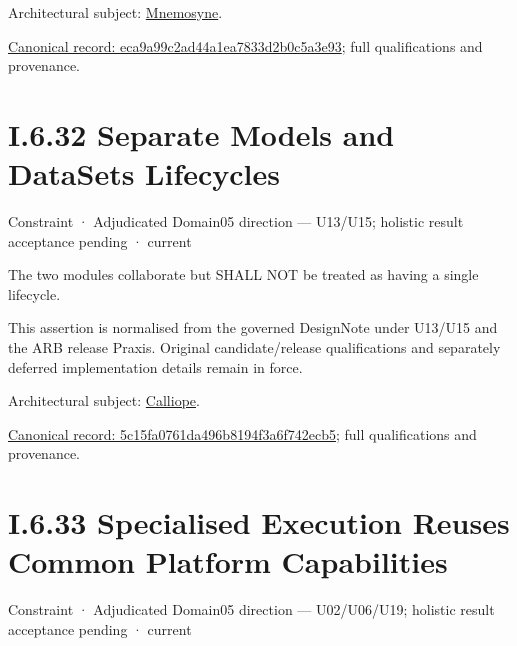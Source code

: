 Architectural subject: \hyperref[element:7985e647bf9e4ca3ba70faf9e3e4ae02]{Mnemosyne}.


{\footnotesize \href{../../../../../../../continuum/motivation/constraint/eca9a99c2ad44a1ea7833d2b0c5a3e93.md}{Canonical record: eca9a99c2ad44a1ea7833d2b0c5a3e93}; full qualifications and provenance.}\par
\section*{I.6.32 Separate Models and DataSets Lifecycles}
\label{navigation:I.6.32}

\label{element:5c15fa0761da496b8194f3a6f742ecb5}
{\small Constraint · Adjudicated Domain05 direction — U13/U15; holistic result acceptance pending · current}\par

The two modules collaborate but SHALL NOT be treated as having a single
lifecycle.



This assertion is normalised from the governed DesignNote under U13/U15 and the ARB release Praxis. Original candidate/release qualifications and separately deferred implementation details remain in force.



Architectural subject: \hyperref[element:466ad8f75a954c0581b5bba090443849]{Calliope}.


{\footnotesize \href{../../../../../../../continuum/motivation/constraint/5c15fa0761da496b8194f3a6f742ecb5.md}{Canonical record: 5c15fa0761da496b8194f3a6f742ecb5}; full qualifications and provenance.}\par
\section*{I.6.33 Specialised Execution Reuses Common Platform Capabilities}
\label{navigation:I.6.33}

\label{element:968e208d336c48b781a4eabd76e6337b}
{\small Constraint · Adjudicated Domain05 direction — U02/U06/U19; holistic result acceptance pending · current}\par

